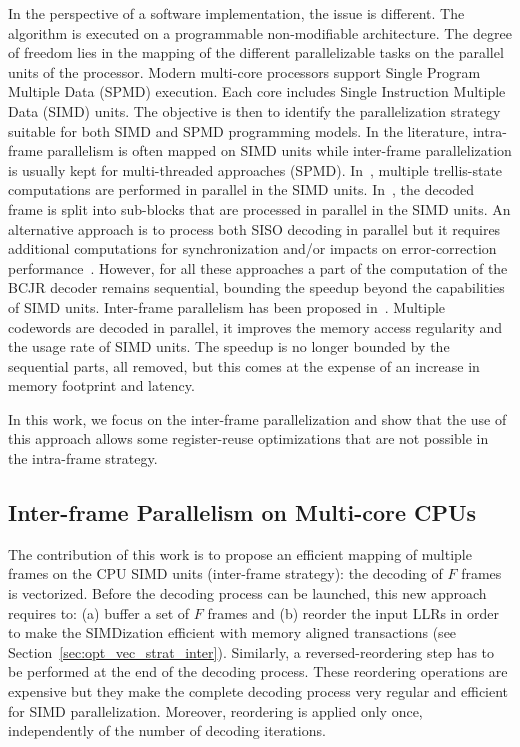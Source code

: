 In the perspective of a software implementation, the issue is different. The
algorithm is executed on a programmable non-modifiable architecture. The degree
of freedom lies in the mapping of the different parallelizable tasks on the
parallel units of the processor. Modern multi-core processors support Single
Program Multiple Data (SPMD) execution. Each core includes Single Instruction
Multiple Data (SIMD) units. The objective is then to identify the
parallelization strategy suitable for both SIMD and SPMD programming models.
In the literature, intra-frame parallelism is often mapped on SIMD units while
inter-frame parallelization is usually kept for multi-threaded approaches
(SPMD). In~\cite{Zhang2012,Wu2013}, multiple trellis-state computations are
performed in parallel in the SIMD units. In~\cite{Wu2010,Wu2011,Chinnici2012,
Yoge2012,Zhang2012,Liu2013,Chen2013,Xianjun2013,Wu2013,Zhang2014,Li2014}, the
decoded frame is split into sub-blocks that are processed in parallel in the
SIMD units. An alternative approach is to process both SISO decoding in parallel
but it requires additional computations for synchronization and/or impacts on
error-correction performance~\cite{Muller2009}. However, for all these
approaches a part of the computation of the BCJR decoder remains sequential,
bounding the speedup beyond the capabilities of SIMD units. Inter-frame
parallelism has been proposed in~\cite{Wu2010,Wu2011,Zhang2012,Wu2013}. Multiple
codewords are decoded in parallel, it improves the memory access regularity and
the usage rate of SIMD units. The speedup is no longer bounded by the sequential
parts, all removed, but this comes at the expense of an increase in memory
footprint and latency.

In this work, we focus on the inter-frame parallelization and show that the use
of this approach allows some register-reuse optimizations that are not possible
in the intra-frame strategy.

\subsection{Inter-frame Parallelism on Multi-core CPUs}

The contribution of this work is to propose an efficient mapping of multiple
frames on the CPU SIMD units (inter-frame strategy): the decoding of $F$ frames
is vectorized. Before the decoding process can be launched, this new approach
requires to: (a) buffer a set of $F$ frames and (b) reorder the input LLRs in
order to make the SIMDization efficient with memory aligned transactions (see
Section~\ref{sec:opt_vec_strat_inter}). Similarly, a reversed-reordering step
has to be performed at the end of the decoding process. These reordering
operations are expensive but they make the complete decoding process very
regular and efficient for SIMD parallelization. Moreover, reordering is applied
only once, independently of the number of decoding iterations.

